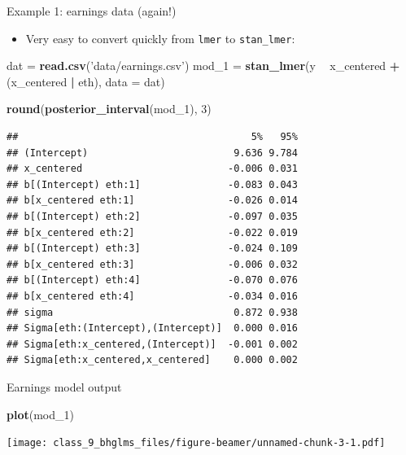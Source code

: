 \documentclass[ignorenonframetext,]{beamer}
\newenvironment{Shaded}{\begin{snugshade}}{\end{snugshade}}
\newcommand{\KeywordTok}[1]{\textcolor[rgb]{0.13,0.29,0.53}{\textbf{#1}}}
\newcommand{\DataTypeTok}[1]{\textcolor[rgb]{0.13,0.29,0.53}{#1}}
\newcommand{\DecValTok}[1]{\textcolor[rgb]{0.00,0.00,0.81}{#1}}
\newcommand{\StringTok}[1]{\textcolor[rgb]{0.31,0.60,0.02}{#1}}
\newcommand{\OperatorTok}[1]{\textcolor[rgb]{0.81,0.36,0.00}{\textbf{#1}}}
\newcommand{\NormalTok}[1]{#1}
\providecommand{\tightlist}{%
  \setlength{\itemsep}{0pt}\setlength{\parskip}{0pt}}
\begin{document}
\begin{frame}[fragile]{Example 1: earnings data (again!)}

\begin{itemize}
\tightlist
\item
  Very easy to convert quickly from \texttt{lmer} to
  \texttt{stan\_lmer}:
\end{itemize}

\tiny

\begin{Shaded}
\begin{Highlighting}[]
\NormalTok{dat =}\StringTok{ }\KeywordTok{read.csv}\NormalTok{(}\StringTok{'data/earnings.csv'}\NormalTok{)}
\NormalTok{mod_}\DecValTok{1}\NormalTok{ =}\StringTok{ }\KeywordTok{stan_lmer}\NormalTok{(y }\OperatorTok{~}\StringTok{ }\NormalTok{x_centered }\OperatorTok{+}\StringTok{ }\NormalTok{(x_centered }\OperatorTok{|}\StringTok{ }\NormalTok{eth), }\DataTypeTok{data =}\NormalTok{ dat)}
\end{Highlighting}
\end{Shaded}

\begin{Shaded}
\begin{Highlighting}[]
\KeywordTok{round}\NormalTok{(}\KeywordTok{posterior_interval}\NormalTok{(mod_}\DecValTok{1}\NormalTok{), }\DecValTok{3}\NormalTok{)}
\end{Highlighting}
\end{Shaded}

\begin{verbatim}
##                                        5%   95%
## (Intercept)                         9.636 9.784
## x_centered                         -0.006 0.031
## b[(Intercept) eth:1]               -0.083 0.043
## b[x_centered eth:1]                -0.026 0.014
## b[(Intercept) eth:2]               -0.097 0.035
## b[x_centered eth:2]                -0.022 0.019
## b[(Intercept) eth:3]               -0.024 0.109
## b[x_centered eth:3]                -0.006 0.032
## b[(Intercept) eth:4]               -0.070 0.076
## b[x_centered eth:4]                -0.034 0.016
## sigma                               0.872 0.938
## Sigma[eth:(Intercept),(Intercept)]  0.000 0.016
## Sigma[eth:x_centered,(Intercept)]  -0.001 0.002
## Sigma[eth:x_centered,x_centered]    0.000 0.002
\end{verbatim}

\end{frame}

\begin{frame}[fragile]{Earnings model output}

\begin{Shaded}
\begin{Highlighting}[]
\KeywordTok{plot}\NormalTok{(mod_}\DecValTok{1}\NormalTok{)}
\end{Highlighting}
\end{Shaded}

\texttt{[image: class\_9\_bhglms\_files/figure-beamer/unnamed-chunk-3-1.pdf]}

\end{frame}
\end{document}
